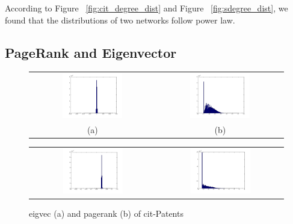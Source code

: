 According to Figure ~\ref{fig:cit_degree_dist} and Figure ~\ref{fig:sdegree_dist}, we found that the distributions of two networks follow power law. 

\subsection{PageRank and Eigenvector}

\begin{figure}[htbf]
\begin{center}
\begin{tabular}{cc}
     \includegraphics[width=0.5\textwidth]{FIG/cit_result/eigvec.png} &
     \includegraphics[width=0.5\textwidth]{FIG/cit_result/pagerank.png} \\
    (a) & (b) 
\end{tabular}
\caption{ eigvec (a) and pagerank (b) of cit-Patents}
\label{fig:cit_eigen}
\begin{tabular}{cc}
     \includegraphics[width=0.5\textwidth]{FIG/soc_result/eigvec.png} &
     \includegraphics[width=0.5\textwidth]{FIG/soc_result/pagerank.png} \\

\end{tabular}
\end{center}
\end{figure}
